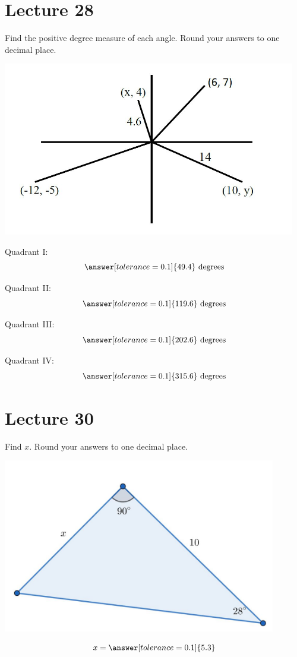\documentclass{ximera}
\begin{document}
 \section{Lecture 28}
\begin{problem}\label{prob:160hom11prob1}
Find the positive degree measure of each angle. Round your answers to one decimal place.
\begin{image}
   
\includegraphics[height=3in]{160H11pic1.jpg}~
 
\end{image}

Quadrant I:
$$\answer[tolerance=0.1]{49.4}\mbox{ degrees}$$

Quadrant II:
$$\answer[tolerance=0.1]{119.6}\mbox{ degrees}$$

Quadrant III:
$$\answer[tolerance=0.1]{202.6}\mbox{ degrees}$$

Quadrant IV:
$$\answer[tolerance=0.1]{315.6}\mbox{ degrees}$$
\end{problem}
 
 
 
 
 
  \section{Lecture 30}
  \begin{problem}\label{prob:160hom12prob1}
  Find $x$.  Round your answers to one decimal place.
\begin{image}
   
\includegraphics[height=3in]{160H12pic1.jpg}~
 
\end{image}
$$x=\answer[tolerance=0.1]{5.3}$$
\end{problem}
\end{document}
